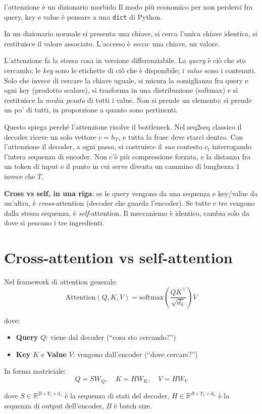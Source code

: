 \begin{intuizione}{l'attenzione è un dizionario morbido}
Il modo più economico per non perdersi fra query, key e value è pensare a una \texttt{dict} di Python.

In un dizionario normale si presenta una chiave, si cerca l'unica chiave identica, si restituisce il valore associato. L'accesso è \emph{secco}: una chiave, un valore.

L'attenzione fa la stessa cosa in versione differenziabile. La \emph{query} è ciò che sto cercando; le \emph{key} sono le etichette di ciò che è disponibile; i \emph{value} sono i contenuti. Solo che invece di cercare la chiave uguale, si misura la somiglianza fra query e ogni key (prodotto scalare), si trasforma in una distribuzione (softmax) e si restituisce la \emph{media pesata} di tutti i value. Non si prende un elemento: si prende un po' di tutti, in proporzione a quanto sono pertinenti.

Questo spiega perché l'attenzione risolve il bottleneck. Nel seq2seq classico il decoder riceve un solo vettore $c = h_T$, e tutta la frase deve starci dentro. Con l'attenzione il decoder, a ogni passo, si costruisce il \emph{suo} contesto $c_t$ interrogando l'intera sequenza di encoder. Non c'è più compressione forzata, e la distanza fra un token di input e il punto in cui serve diventa un cammino di lunghezza $1$ invece che $T$.

\textbf{Cross vs self, in una riga}: se le query vengono da una sequenza e key/value da un'altra, è \emph{cross}-attention (decoder che guarda l'encoder). Se tutte e tre vengono dalla stessa sequenza, è \emph{self}-attention. Il meccanismo è identico, cambia solo da dove si pescano i tre ingredienti.
\end{intuizione}

\section{Cross-attention vs self-attention}

\begin{definition}
Nel framework di attention generale:
\[
\text{Attention}(Q, K, V) = \text{softmax}\left(\frac{QK^\top}{\sqrt{d_k}}\right) V
\]

dove:
\begin{itemize}
\item \textbf{Query} $Q$: viene dal decoder (``cosa sto cercando?'')
\item \textbf{Key} $K$ e \textbf{Value} $V$: vengono dall'encoder (``dove cercare?'')
\end{itemize}

In forma matriciale:
\[
Q = S W_Q, \quad K = H W_K, \quad V = H W_V
\]

dove $S \in \mathbb{R}^{B \times T_s \times d_s}$ è la sequenza di stati del decoder, $H \in \mathbb{R}^{B \times T_x \times d_h}$ è la sequenza di output dell'encoder, $B$ è batch size.
\end{definition}


